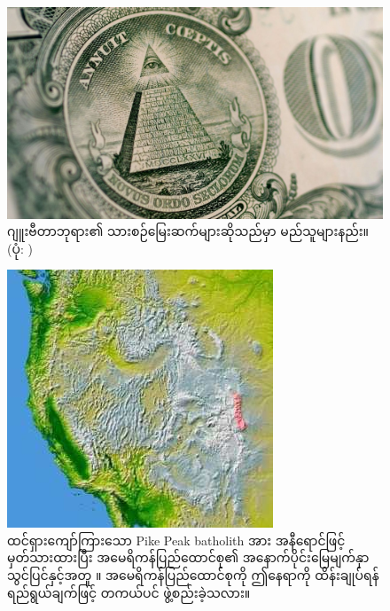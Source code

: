 \documentclass[10pt,twocolumn,letterpaper]{article}
\begin{document}
\begin{figure}[t]
\begin{center}
   \includegraphics[width=1\linewidth]{illuminati.jpg}
\end{center}
   \caption{ဂျူးဗီတာဘုရား၏ သားစဉ်မြေးဆက်များဆိုသည်မှာ မည်သူများနည်း။ (ပုံ: \cite{35})}
\label{fig:10}
\label{fig:onecol}
\end{figure}

\begin{figure}[t]
\begin{center}
   \includegraphics[width=1\linewidth]{pike.jpg}
\end{center}
   \caption{ထင်ရှားကျော်ကြားသော Pike Peak batholith အား အနီရောင်ဖြင့် မှတ်သားထားပြီး အမေရိကန်ပြည်ထောင်စု၏ အနောက်ပိုင်းမြေမျက်နှာသွင်ပြင်နှင့်အတူ \cite{36}။ အမေရိကန်ပြည်ထောင်စုကို ဤနေရာကို ထိန်းချုပ်ရန် ရည်ရွယ်ချက်ဖြင့် တကယ်ပင် ဖွဲ့စည်းခဲ့သလား။}
\label{fig:11}
\label{fig:onecol}
\end{figure}
\end{document}
